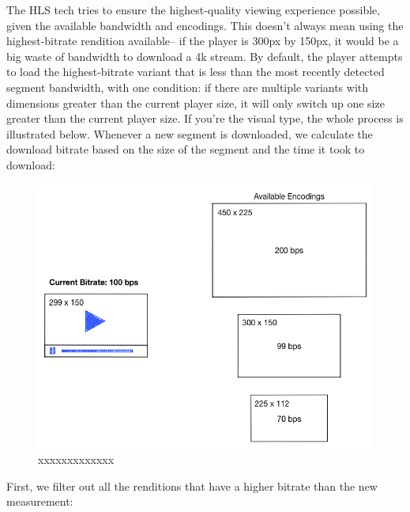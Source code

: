 The HLS tech tries to ensure the highest-quality viewing experience possible, given the available bandwidth and encodings. This doesn't always mean using the highest-bitrate rendition available-- if the player is 300px by 150px, it would be a big waste of bandwidth to download a 4k stream. By default, the player attempts to load the highest-bitrate variant that is less than the most recently detected segment bandwidth, with one condition: if there are multiple variants with dimensions greater than the current player size, it will only switch up one size greater than the current player size.
If you're the visual type, the whole process is illustrated below. Whenever a new segment is downloaded, we calculate the download bitrate based on the size of the segment and the time it took to download:



\begin{figure}[htb] %
 \centering
 \includegraphics[width=1.0\linewidth]{images/chapter4/bitrate-switching-1.png}\hfill
 \caption[xxxxxxxxx]{xxxxxxxxxxxxx}
 \label{fig:fourV}
\end{figure}


First, we filter out all the renditions that have a higher bitrate than the new measurement:


